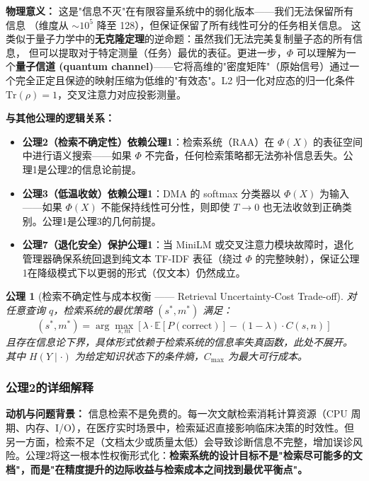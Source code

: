 \documentclass[11pt,a4paper]{ctexart}
\newtheorem{axiom}{公理}[section]
\theoremstyle{remark}
\begin{document}
\textbf{物理意义：} 这是"信息不灭"在有限容量系统中的弱化版本——我们无法保留所有信息
（维度从 $\sim 10^5$ 降至 128），但保证保留了所有线性可分的任务相关信息。
这类似于量子力学中的\textbf{无克隆定理}的逆命题：虽然我们无法完美复制量子态的所有信息，
但可以提取对于特定测量（任务）最优的表征。更进一步，$\Phi$ 可以理解为一个\textbf{量子信道 (quantum channel)}——它将高维的"密度矩阵"（原始信号）通过一个完全正定且保迹的映射压缩为低维的"有效态"。L2 归一化对应态的归一化条件 $\text{Tr}(\rho) = 1$，交叉注意力对应投影测量。

\textbf{与其他公理的逻辑关系：}
\begin{itemize}[nosep]
\item \textbf{公理2（检索不确定性）依赖公理1}：检索系统（RAA）在 $\Phi(X)$ 的表征空间中进行语义搜索——如果 $\Phi$ 不完备，任何检索策略都无法弥补信息丢失。公理1是公理2的信息论前提。
\item \textbf{公理3（低温收敛）依赖公理1}：DMA 的 softmax 分类器以 $\Phi(X)$ 为输入——如果 $\Phi(X)$ 不能保持线性可分性，则即使 $T \to 0$ 也无法收敛到正确类别。公理1是公理3的几何前提。
\item \textbf{公理7（退化安全）保护公理1}：当 MiniLM 或交叉注意力模块故障时，退化管理器确保系统回退到纯文本 TF-IDF 表征（绕过 $\Phi$ 的完整映射），保证公理1在降级模式下以更弱的形式（仅文本）仍然成立。
\end{itemize}

\begin{axiom}[检索不确定性与成本权衡 —— Retrieval Uncertainty-Cost Trade-off]
\label{ax:retrieval}
对任意查询 $q$，检索系统的最优策略 $(s^*, m^*)$ 满足：
\begin{equation}
(s^*, m^*) = \arg\max_{s,m} \left[\lambda \cdot \mathbb{E}[P(\text{correct})] - (1-\lambda) \cdot C(s, n)\right]
\end{equation}
且存在信息论下界，具体形式依赖于检索系统的信息率失真函数，此处不展开。
其中 $H(Y \mid \cdot)$ 为给定知识状态下的条件熵，$C_{\max}$ 为最大可行成本。
\end{axiom}

\subsubsection{公理2的详细解释}

\textbf{动机与问题背景：} 信息检索不是免费的。每一次文献检索消耗计算资源（CPU 周期、内存、I/O），在医疗实时场景中，检索延迟直接影响临床决策的时效性。但另一方面，检索不足（文档太少或质量太低）会导致诊断信息不完整，增加误诊风险。公理2将这一根本性权衡形式化：\textbf{检索系统的设计目标不是"检索尽可能多的文档"，而是"在精度提升的边际收益与检索成本之间找到最优平衡点"。}
\end{document}
